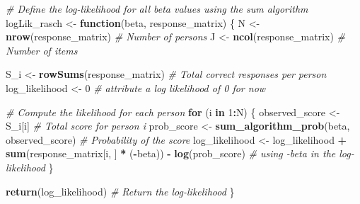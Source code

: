 \documentclass[
]{article}
\newenvironment{Shaded}{\begin{snugshade}}{\end{snugshade}}
\newcommand{\CommentTok}[1]{\textcolor[rgb]{0.56,0.35,0.01}{\textit{#1}}}
\newcommand{\ControlFlowTok}[1]{\textcolor[rgb]{0.13,0.29,0.53}{\textbf{#1}}}
\newcommand{\DecValTok}[1]{\textcolor[rgb]{0.00,0.00,0.81}{#1}}
\newcommand{\FunctionTok}[1]{\textcolor[rgb]{0.13,0.29,0.53}{\textbf{#1}}}
\newcommand{\NormalTok}[1]{#1}
\newcommand{\OtherTok}[1]{\textcolor[rgb]{0.56,0.35,0.01}{#1}}
\newcommand{\SpecialCharTok}[1]{\textcolor[rgb]{0.81,0.36,0.00}{\textbf{#1}}}
\begin{document}
\begin{Shaded}
\begin{Highlighting}[]
\CommentTok{\# Define the log{-}likelihood for all beta values using the sum algorithm}
\NormalTok{logLik\_rasch }\OtherTok{\textless{}{-}} \ControlFlowTok{function}\NormalTok{(beta, response\_matrix) \{}
\NormalTok{  N }\OtherTok{\textless{}{-}} \FunctionTok{nrow}\NormalTok{(response\_matrix)  }\CommentTok{\# Number of persons}
\NormalTok{  J }\OtherTok{\textless{}{-}} \FunctionTok{ncol}\NormalTok{(response\_matrix)  }\CommentTok{\# Number of items}
  
\NormalTok{  S\_i }\OtherTok{\textless{}{-}} \FunctionTok{rowSums}\NormalTok{(response\_matrix)  }\CommentTok{\# Total correct responses per person}
\NormalTok{  log\_likelihood }\OtherTok{\textless{}{-}} \DecValTok{0} \CommentTok{\# attribute a log likelihood of 0 for now}
  
  \CommentTok{\# Compute the likelihood for each person}
  \ControlFlowTok{for}\NormalTok{ (i }\ControlFlowTok{in} \DecValTok{1}\SpecialCharTok{:}\NormalTok{N) \{}
\NormalTok{    observed\_score }\OtherTok{\textless{}{-}}\NormalTok{ S\_i[i]  }\CommentTok{\# Total score for person i}
\NormalTok{    prob\_score }\OtherTok{\textless{}{-}} \FunctionTok{sum\_algorithm\_prob}\NormalTok{(beta, observed\_score)  }\CommentTok{\# Probability of the score}
\NormalTok{    log\_likelihood }\OtherTok{\textless{}{-}}\NormalTok{ log\_likelihood }\SpecialCharTok{+} \FunctionTok{sum}\NormalTok{(response\_matrix[i, ] }\SpecialCharTok{*}\NormalTok{ (}\SpecialCharTok{{-}}\NormalTok{beta)) }\SpecialCharTok{{-}} \FunctionTok{log}\NormalTok{(prob\_score) }\CommentTok{\# using {-}beta in the log{-}likelihood}
\NormalTok{  \}}
  
  \FunctionTok{return}\NormalTok{(log\_likelihood)  }\CommentTok{\# Return the log{-}likelihood}
\NormalTok{\}}
\end{Highlighting}
\end{Shaded}
\end{document}
